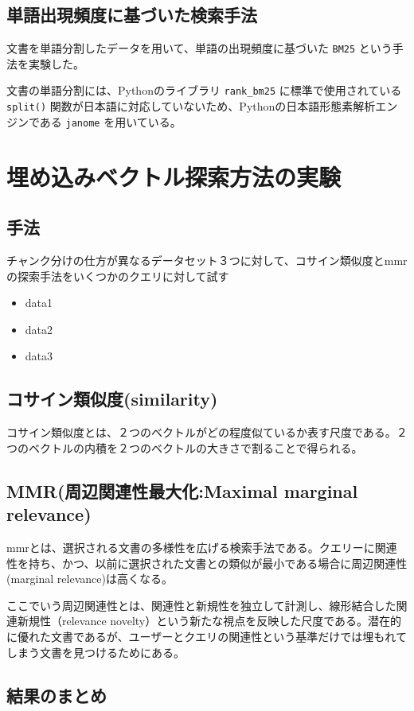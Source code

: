 \subsection{単語出現頻度に基づいた検索手法}
文書を単語分割したデータを用いて、単語の出現頻度に基づいた \texttt{BM25} という手法を実験した。 \par
文書の単語分割には、Pythonのライブラリ \texttt{rank\_bm25} に標準で使用されている \texttt{split()} 関数が日本語に対応していないため、Pythonの日本語形態素解析エンジンである \texttt{janome} を用いている。 \par

\section{埋め込みベクトル探索方法の実験}
\subsection{手法}
チャンク分けの仕方が異なるデータセット３つに対して、コサイン類似度とmmrの探索手法をいくつかのクエリに対して試す
\begin{itemize}
 \item data1
 \item data2
 \item data3
\end{itemize}

\subsection{コサイン類似度(similarity)}
コサイン類似度とは、２つのベクトルがどの程度似ているか表す尺度である。２つのベクトルの内積を２つのベクトルの大きさで割ることで得られる。

\subsection{MMR(周辺関連性最大化:Maximal marginal relevance)}
mmrとは、選択される文書の多様性を広げる検索手法である。クエリーに関連性を持ち、かつ、以前に選択された文書との類似が最小である場合に周辺関連性(marginal relevance)は高くなる。\par
ここでいう周辺関連性とは、関連性と新規性を独立して計測し、線形結合した関連新規性（relevance novelty）という新たな視点を反映した尺度である。潜在的に優れた文書であるが、ユーザーとクエリの関連性という基準だけでは埋もれてしまう文書を見つけるためにある。\\

\subsection{結果のまとめ}

